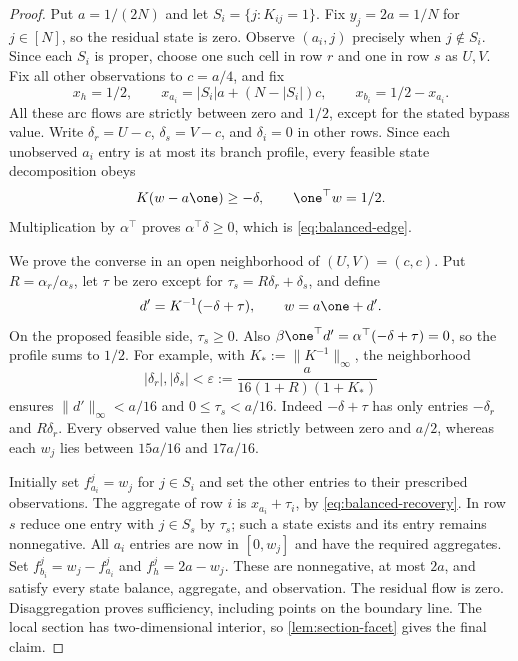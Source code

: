 \begin{proof}
Put $a=1/(2N)$ and let $S_i=\{j:K_{ij}=1\}$. Fix
$y_j=2a=1/N$ for $j\in[N]$, so the residual state is zero.
Observe $(a_i,j)$ precisely when $j\notin S_i$. Since each $S_i$
is proper, choose one such cell in row $r$ and one in row $s$ as
$U,V$. Fix all other observations to $c=a/4$, and fix
\begin{equation}\label{eq:balanced-aggregate}
 x_h=1/2,\qquad
 x_{a_i}=|S_i|a+(N-|S_i|)c,\qquad
 x_{b_i}=1/2-x_{a_i}.
\end{equation}
All these arc flows are strictly between zero and $1/2$, except for
the stated bypass value. Write $\delta_r=U-c$, $\delta_s=V-c$,
and $\delta_i=0$ in other rows. Since each unobserved $a_i$ entry
is at most its branch profile, every feasible state decomposition obeys
\[
 K(w-a\one)\ge-\delta,\qquad \one^\top w=1/2.
\]
Multiplication by $\alpha^\top$ proves
$\alpha^\top\delta\ge0$, which is \eqref{eq:balanced-edge}.

We prove the converse in an open neighborhood of $(U,V)=(c,c)$.
Put $R=\alpha_r/\alpha_s$, let $\tau$ be zero except for
$\tau_s=R\delta_r+\delta_s$, and define
\begin{equation}\label{eq:balanced-recovery}
 d'=K^{-1}(-\delta+\tau),\qquad w=a\one+d'.
\end{equation}
On the proposed feasible side, $\tau_s\ge0$. Also
$\beta\one^\top d'=\alpha^\top(-\delta+\tau)=0$,
so the profile sums to $1/2$.
For example, with $K_*:=\|K^{-1}\|_\infty$, the neighborhood
\[
 |\delta_r|,|\delta_s|<
 \varepsilon:=\frac{a}{16(1+R)(1+K_*)}
\]
ensures $\|d'\|_\infty<a/16$ and $0\le\tau_s<a/16$.
Indeed $-\delta+\tau$ has only entries $-\delta_r$ and
$R\delta_r$. Every observed value then lies strictly between zero
and $a/2$, whereas each $w_j$ lies between $15a/16$ and $17a/16$.

Initially set $f^j_{a_i}=w_j$ for $j\in S_i$ and set the other
entries to their prescribed observations. The aggregate of row $i$
is $x_{a_i}+\tau_i$, by \eqref{eq:balanced-recovery}.
In row $s$ reduce one entry with $j\in S_s$ by $\tau_s$;
such a state exists and its entry remains nonnegative. All $a_i$
entries are now in $[0,w_j]$ and have the required aggregates.
Set $f^j_{b_i}=w_j-f^j_{a_i}$ and $f^j_h=2a-w_j$.
These are nonnegative, at most $2a$, and satisfy every state balance,
aggregate, and observation. The residual flow is zero. Disaggregation
proves sufficiency, including points on the boundary line. The local
section has two-dimensional interior, so \cref{lem:section-facet}
gives the final claim.
\end{proof}

